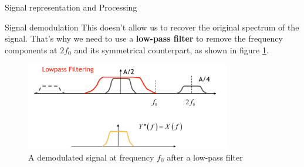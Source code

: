 \begin{section}{Signal representation and Processing}
\begin{subsection}{Signal demodulation}
      This doesn't allow us to recover the original spectrum of the signal.
      That's why we need to use a \textbf{low-pass filter} to remove the frequency components at
      $2f_0$ and its symmetrical counterpart, as shown in figure \ref{fig:Demodulation3}.\\
      \begin{figure}[h]
        \centering
        \includegraphics[width=0.8\textwidth]{img/demodulation3.png}
        \caption{A demodulated signal at frequency $f_0$ after a low-pass filter}
        \label{fig:Demodulation3}
      \end{figure}


\end{subsection}
\end{section}
